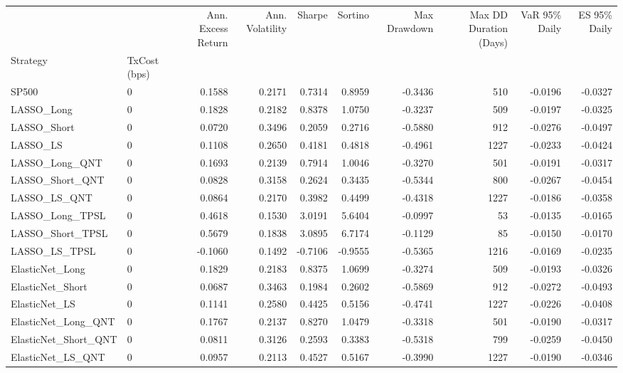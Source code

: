 \begin{tabular}{llrrrrrrrr}
\toprule
 &  & Ann. Excess Return & Ann. Volatility & Sharpe & Sortino & Max Drawdown & Max DD Duration (Days) & VaR 95\% Daily & ES 95\% Daily \\
Strategy & TxCost (bps) &  &  &  &  &  &  &  &  \\
\midrule
SP500 & 0 & 0.1588 & 0.2171 & 0.7314 & 0.8959 & -0.3436 & 510 & -0.0196 & -0.0327 \\
\cline{1-10}
LASSO\_Long & 0 & 0.1828 & 0.2182 & 0.8378 & 1.0750 & -0.3237 & 509 & -0.0197 & -0.0325 \\
\cline{1-10}
LASSO\_Short & 0 & 0.0720 & 0.3496 & 0.2059 & 0.2716 & -0.5880 & 912 & -0.0276 & -0.0497 \\
\cline{1-10}
LASSO\_LS & 0 & 0.1108 & 0.2650 & 0.4181 & 0.4818 & -0.4961 & 1227 & -0.0233 & -0.0424 \\
\cline{1-10}
LASSO\_Long\_QNT & 0 & 0.1693 & 0.2139 & 0.7914 & 1.0046 & -0.3270 & 501 & -0.0191 & -0.0317 \\
\cline{1-10}
LASSO\_Short\_QNT & 0 & 0.0828 & 0.3158 & 0.2624 & 0.3435 & -0.5344 & 800 & -0.0267 & -0.0454 \\
\cline{1-10}
LASSO\_LS\_QNT & 0 & 0.0864 & 0.2170 & 0.3982 & 0.4499 & -0.4318 & 1227 & -0.0186 & -0.0358 \\
\cline{1-10}
LASSO\_Long\_TPSL & 0 & 0.4618 & 0.1530 & 3.0191 & 5.6404 & -0.0997 & 53 & -0.0135 & -0.0165 \\
\cline{1-10}
LASSO\_Short\_TPSL & 0 & 0.5679 & 0.1838 & 3.0895 & 6.7174 & -0.1129 & 85 & -0.0150 & -0.0170 \\
\cline{1-10}
LASSO\_LS\_TPSL & 0 & -0.1060 & 0.1492 & -0.7106 & -0.9555 & -0.5365 & 1216 & -0.0169 & -0.0235 \\
\cline{1-10}
ElasticNet\_Long & 0 & 0.1829 & 0.2183 & 0.8375 & 1.0699 & -0.3274 & 509 & -0.0193 & -0.0326 \\
\cline{1-10}
ElasticNet\_Short & 0 & 0.0687 & 0.3463 & 0.1984 & 0.2602 & -0.5869 & 912 & -0.0272 & -0.0493 \\
\cline{1-10}
ElasticNet\_LS & 0 & 0.1141 & 0.2580 & 0.4425 & 0.5156 & -0.4741 & 1227 & -0.0226 & -0.0408 \\
\cline{1-10}
ElasticNet\_Long\_QNT & 0 & 0.1767 & 0.2137 & 0.8270 & 1.0479 & -0.3318 & 501 & -0.0190 & -0.0317 \\
\cline{1-10}
ElasticNet\_Short\_QNT & 0 & 0.0811 & 0.3126 & 0.2593 & 0.3383 & -0.5318 & 799 & -0.0259 & -0.0450 \\
\cline{1-10}
ElasticNet\_LS\_QNT & 0 & 0.0957 & 0.2113 & 0.4527 & 0.5167 & -0.3990 & 1227 & -0.0190 & -0.0346 \\

\end{tabular}
